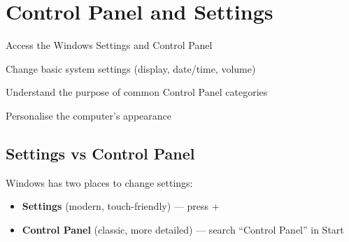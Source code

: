 
\chapter{Control Panel and Settings}
\label{ch:control-panel}

\begin{objectives}
  \item Access the Windows Settings and Control Panel
  \item Change basic system settings (display, date/time, volume)
  \item Understand the purpose of common Control Panel categories
  \item Personalise the computer's appearance
\end{objectives}


\section{Settings vs Control Panel}
\label{sec:settings-vs-cp}

Windows has two places to change settings:
\begin{itemize}[leftmargin=*, label={\textcolor{ModuleBlue}{\faAngleRight}}, itemsep=3pt]
  \item \textbf{Settings} (modern, touch-friendly) --- press +
  \item \textbf{Control Panel} (classic, more detailed) --- search ``Control Panel'' in Start
\end{itemize}

